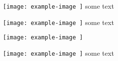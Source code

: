 \texttt{[image: 
	example-image
]}
some text

\texttt{[image: 
	example-image
]}
some text

\texttt{[image: 
	example-image
]}
%

\texttt{[image: 
	example-image
]}
some text
